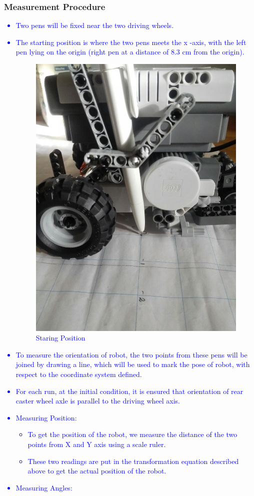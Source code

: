 \documentclass[10pt,a4paper]{article}
\begin{document}
				\subsubsection{Measurement Procedure} \textcolor{blue}{
				\begin{itemize}
					\item Two pens will be fixed near the two driving wheels.
					\item The starting position is where the two pens meets the x -axis, with the left pen lying on the origin (right pen at a distance of  8.3 cm from the origin).			
					\begin{figure}[h]
						\centering
						\includegraphics[width=0.4\linewidth]{img/starting-pt.jpeg}
						\caption{Staring Position}
						\label{fig:startingView}
					\end{figure}
					\item To measure the orientation of robot, the two points from these pens will be joined by drawing a line, which will be used to mark the pose of robot, with respect to the coordinate system defined.
					\item For each run, at the initial condition, it is ensured that orientation of rear caster wheel axle is parallel to the driving wheel axis.
					\item Measuring Position:
						\begin{itemize}
							\item To get the position of the robot, we measure the distance of the two points from X and Y axis using a scale ruler.
							\item These two readings are put in the transformation equation described above to get the actual position of the robot.
						\end{itemize}
					\item Measuring Angles:
						\begin{itemize}

\end{itemize}
\end{itemize}}
\end{document}
